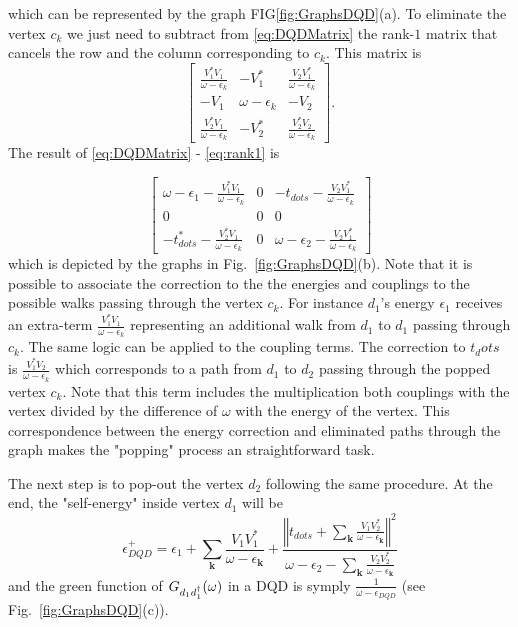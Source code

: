 \documentclass[showpacs,aps,prb,reprint,superscriptaddress]{revtex4-1}
\begin{document}
\noindent which can be represented by the graph FIG\ref{fig:GraphsDQD}(a). To eliminate the vertex $c_k$ we just need to subtract from \eqref{eq:DQDMatrix} the rank-$1$ matrix that cancels the row and the column corresponding to $c_k$. This matrix is 
\begin{equation}
        \left[\begin{array}{ccc}
    \frac{V_{1}^{*}V_{1}}{\omega-\epsilon_{k}} & -V_{1}^{*} & \frac{V_{2}V_{1}^{*}}{\omega-\epsilon_{k}}\\
    -V_{1} & \omega-\epsilon_{k} & -V_{2}\\
    \frac{V_{2}^{*}V_{1}}{\omega-\epsilon_{k}} & -V_{2}^{*} & \frac{V_{2}^{*}V_{2}}{\omega-\epsilon_{k}}
    \end{array}\right]. \label{eq:rank1}
\end{equation}
The result of \eqref{eq:DQDMatrix} -  \eqref{eq:rank1} is 

\begin{equation}
        \left[\begin{array}{ccc}
    \omega-\epsilon_{1}-\frac{V_{1}^{*}V_{1}}{\omega-\epsilon_{k}} & 0 & -t_{dots}-\frac{V_{2}V_{1}^{*}}{\omega-\epsilon_{k}}\\
    0 & 0 & 0\\
    -t_{dots}^{*}-\frac{V_{2}^{*}V_{1}}{\omega-\epsilon_{k}} & 0 & \omega-\epsilon_{2}-\frac{V_{2}V_{1}^{*}}{\omega-\epsilon_{k}}
    \end{array}\right]
\end{equation}
\noindent which is depicted by the graphs in Fig.\ \ref{fig:GraphsDQD}(b). Note that it is possible to associate the correction to the the energies and couplings to the possible walks passing through the vertex $c_k$.  For instance $d_1$'s energy $\epsilon_1$ receives an extra-term $\frac{V_{1}^{*}V_{1}}{\omega-\epsilon_{k}}$ representing an additional walk  from $d_1$ to $d_1$ passing through  $c_k$. The same logic can be applied to the  coupling terms. The correction to $t_dots$ is $\frac{V_{1}^{*}V_{2}}{\omega-\epsilon_{k}}$ which corresponds to a path from $d_1$ to $d_2$ passing through the popped vertex $c_k$. Note that this term includes the multiplication both couplings with the vertex divided by the difference of $\omega$ with the energy of the vertex. This correspondence between the energy correction and eliminated paths through the graph makes the "popping" process an straightforward task. 


The next step is to pop-out the vertex $d_2$ following the same procedure. At the end, the "self-energy" inside  vertex $d_1$ will be
\begin{equation}
    \epsilon^+_{DQD}=\epsilon_{1}+\sum_{\mathbf{k}}\frac{V_{1}V_{1}^{*}}{\omega-\epsilon_{\mathbf{k}}}+\frac{\left\Vert t_{dots}+\sum_{\mathbf{k}}\frac{V_{1}V_{2}^{*}}{\omega-\epsilon_{\mathbf{k}}}\right\Vert ^{2}}{\omega-\epsilon_{2}-\sum_{\mathbf{k}}\frac{V_{2}V_{2}^{*}}{\omega-\epsilon_{\mathbf{k}}}} \label{eq:EnDQD}
\end{equation}
and the green function of $G_{d_1d^\dagger_1}(\omega)$ in a DQD is symply $\frac{1}{\omega -  \epsilon_{DQD}}$ (see Fig.\ \ref{fig:GraphsDQD}(c)).
\end{document}
